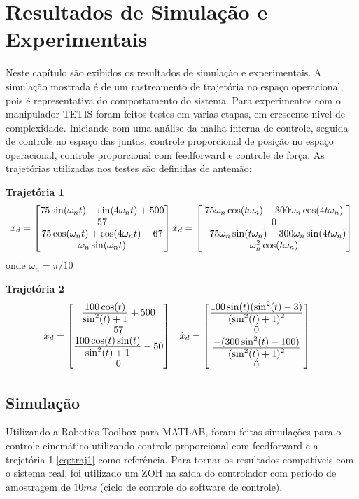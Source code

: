 \chapter{Resultados de Simulação e Experimentais}

Neste capítulo são exibidos os resultados de simulação e experimentais. A simulação mostrada é de um rastreamento de trajetória no espaço operacional, pois é representativa do comportamento do sistema. Para experimentos com o manipulador TETIS foram feitos testes em varias etapas, em crescente nível de complexidade. Iniciando com uma análise da malha interna de controle, seguida de controle no espaço das juntas, controle proporcional de posição no espaço operacional, controle proporcional com feedforward e controle de força. As trajetórias utilizadas nos testes são definidas de antemão:

\textbf{Trajetória 1}
\begin{gather} \label{eq:traj1}
{x_d} = \begin{bmatrix}75 \sin(\omega_n t) + \sin (4 \omega_n t) + 500 \\ 57 \\ 75 \cos(\omega_n t) + \cos(4\omega_n t) -67 \\ \omega_n \sin(\omega_nt) \end{bmatrix}
{\dot{x}_d} = \begin{bmatrix}75\omega_n \cos(t\omega_n) + 300 \omega_n \cos(4t\omega_n) \\
0 \\
-75 \omega_n \sin(t \omega_n) - 300 \omega_n \sin(4t\omega_n) \\
\omega_n^2 \cos(t \omega_n)\end{bmatrix}
\end{gather}
onde $\omega_n = \pi/10$

\textbf{Trajetória 2} 
\begin{align} \label{eq:traj2}
{x_d} &= \begin{bmatrix} 
\frac{\displaystyle 100 \cos(t)}{\displaystyle \sin^2(t) + 1} + 500 \\
57 \\
\frac{\displaystyle 100\cos(t) \sin(t)}{\displaystyle \sin^2(t) + 1} -50 \\
0
\end{bmatrix} &&
{\dot{x}_d} = \begin{bmatrix}
\frac{\displaystyle 100\sin(t) (\sin^2(t) -3 )}{\displaystyle (\sin^2(t) + 1)^2} \\
0 \\
\frac{\displaystyle -(300 \sin^2(t) - 100)}{\displaystyle (\sin^2(t) + 1)^2} \\
0\end{bmatrix}
\end{align}

\section{Simulação}
Utilizando a Robotics Toolbox \citep{petercorke} para MATLAB\circledR, foram feitas simulações para o controle cinemático utilizando controle proporcional com feedforward e a trejetória 1 \eqref{eq:traj1} como referência. Para tornar os resultados compatíveis com o sistema real, foi utilizado um ZOH na saída do controlador com período de amostragem de $10ms$ (ciclo de controle do software de controle).

